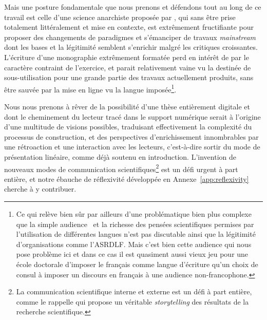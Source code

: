 Mais une posture fondamentale que nous prenons et défendons tout au long de ce travail est celle d'une science anarchiste proposée par , qui sans être prise totalement littéralement et mise en contexte, est extrêmement fructifiante pour proposer des changements de paradigmes et s'émanciper de travaux \emph{mainstream} dont les bases et la légitimité semblent s'enrichir malgré les critiques croissantes. L'écriture d'une monographie extrêmement formatée perd en intérêt de par le caractère contraint de l'exercice, et parait relativement vaine vu la destinée de sous-utilisation pour une grande partie des travaux actuellement produits, sans être sauvée par la mise en ligne vu la langue imposée\footnote{Ce qui relève bien sûr par ailleurs d'une problématique bien plus complexe que la simple audience~\cite{tardy2004role} et la richesse des pensées scientifiques permises par l'utilisation de différentes langues n'est pas discutable ainsi que la légitimité d'organisations comme l'ASRDLF. Mais c'est bien cette audience qui nous pose problème ici et dans ce cas il est quasiment aussi vieux jeu pour une école doctorale d'imposer le français comme langue d'écriture qu'un choix de consul à imposer un discours en français à une audience non-francophone.}.


Nous nous prenons à rêver de la possibilité d'une thèse entièrement digitale et dont le cheminement du lecteur tracé dans le support numérique serait à l'origine d'une multitude de visions possibles, traduisant effectivement la complexité du processus de construction, et des perspectives d'enrichissement innombrables par une rétroaction et une interaction avec les lecteurs, c'est-à-dire sortir du mode de présentation linéaire, comme déjà soutenu en introduction. L'invention de nouveaux modes de communication scientifiques\footnote{La communication scientifique interne et externe est un défi à part entière, comme le rappelle \cite{Martinez-Conde01082017} qui propose un véritable \emph{storytelling} des résultats de la recherche scientifique.} est un défi urgent à part entière, et notre ébauche de réflexivité développée en Annexe~\ref{app:reflexivity} cherche à y contribuer.




